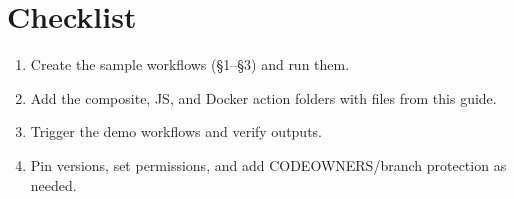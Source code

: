 \documentclass[11pt]{article}
\begin{document}
\section{Checklist}
\begin{enumerate}
  \item Create the sample workflows (\S1--\S3) and run them.
  \item Add the composite, JS, and Docker action folders with files from this guide.
  \item Trigger the demo workflows and verify outputs.
  \item Pin versions, set permissions, and add CODEOWNERS/branch protection as needed.
\end{enumerate}
\end{document}
